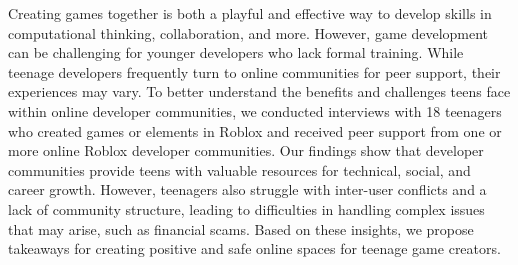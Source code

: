 Creating games together is both a playful and effective way to develop skills in computational thinking, collaboration, and more. However, game development can be challenging for younger developers who lack formal training. While teenage developers frequently turn to online communities for peer support, their experiences may vary. To better understand the benefits and challenges teens face within online developer communities, we conducted interviews with 18 teenagers who created games or elements in Roblox and received peer support from one or more online Roblox developer communities. Our findings show that developer communities provide teens with valuable resources for technical, social, and career growth. However, teenagers also struggle with inter-user conflicts and a lack of community structure, leading to difficulties in handling complex issues that may arise, such as financial scams. Based on these insights, we propose takeaways for creating positive and safe online spaces for teenage game creators. 